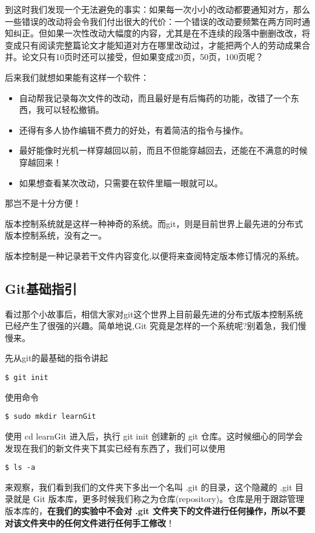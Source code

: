 到这时我们发现一个无法避免的事实：如果每一次小小的改动都要通知对方，那么一些错误的改动将会令我们付出很大的代价：一个错误的改动要频繁在两方同时通知纠正。但如果一次性改动大幅度的内容，尤其是在不连续的段落中删删改改，将变成只有阅读完整篇论文才能知道对方在哪里改动过，才能把两个人的劳动成果合并。论文只有10页时还可以接受，但如果变成20页，50页，100页呢？

后来我们就想如果能有这样一个软件：
\begin{itemize}
\item 自动帮我记录每次文件的改动，而且最好是有后悔药的功能，改错了一个东西，我可以轻松撤销。
\item 还得有多人协作编辑不费力的好处，有着简洁的指令与操作。
\item 最好能像时光机一样穿越回以前，而且不但能穿越回去，还能在不满意的时候穿越回来！
\item 如果想查看某次改动，只需要在软件里瞄一眼就可以。
\end{itemize}

那岂不是十分方便！

版本控制系统就是这样一种神奇的系统。而git，则是目前世界上最先进的分布式版本控制系统，没有之一。
\begin{note}
版本控制是一种记录若干文件内容变化,以便将来查阅特定版本修订情况的系统。
\end{note}

\subsection{Git基础指引}
看过那个小故事后，相信大家对git这个世界上目前最先进的分布式版本控制系统已经产生了很强的兴趣。简单地说,Git 究竟是怎样的一个系统呢?别着急，我们慢慢来。

先从git的最基础的指令讲起

\begin{verbatim}
$ git init
\end{verbatim}

使用命令
\begin{verbatim}
$ sudo mkdir learnGit
\end{verbatim}
使用 cd learnGit 进入后，执行 git init 创建新的 git 仓库。这时候细心的同学会发现在我们的新文件夹下其实已经有东西了，我们可以使用
\begin{verbatim}
$ ls -a
\end{verbatim}
来观察，我们看到我们的文件夹下多出一个名叫 .git 的目录，这个隐藏的 .git 目录就是 Git 版本库，更多时候我们称之为仓库(repository)。仓库是用于跟踪管理版本库的，\textbf{在我们的实验中不会对 .git 文件夹下的文件进行任何操作，所以不要对该文件夹中的任何文件进行任何手工修改}！

